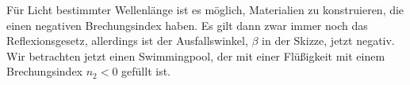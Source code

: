 \begin{minipage}[b]{.8\textwidth}
\begin{Exercise}[label = negr, origin = Aaron Wild, difficulty = 3, title = negativer Brechungsindex]
	Für Licht bestimmter Wellenlänge ist es möglich, Materialien zu konstruieren, die einen negativen Brechungsindex haben. Es gilt dann zwar immer noch das Reflexionsgesetz, allerdings ist der Ausfallswinkel, $\beta$ in der Skizze, jetzt negativ.\\
	Wir betrachten jetzt einen Swimmingpool, der mit einer Flüßigkeit mit einem Brechungsindex $n_2<0$ gefüllt ist. 
\end{Exercise}
\end{minipage}
\hfill
\begin{minipage}[b]{0.2\textwidth}
	\centering
{}
\end{minipage}